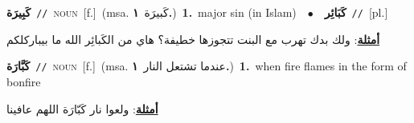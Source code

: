 \documentclass[10pt,a4paper,twoside]{article} %
\begin{document}
\begin{multicols}{2}
{\setlength\topsep{0pt}\textbf{\foreignlanguage{arabic}{كَبِيرَة}}\ {\color{gray}\texttt{//}\color{black}}\ \textsc{noun}\ [f.]\ \color{gray}(msa. \foreignlanguage{arabic}{كَبيرَة}~\foreignlanguage{arabic}{\textbf{١.}})\color{black}\ \textbf{1.}~major sin (in Islam)\ \ $\bullet$\ \ \setlength\topsep{0pt}\textbf{\foreignlanguage{arabic}{كَبَائِر}}\ {\color{gray}\texttt{//}\color{black}}\ [pl.]\  \begin{flushright}\color{gray}\foreignlanguage{arabic}{\textbf{\underline{\foreignlanguage{arabic}{أمثلة}}}: ولك بدك تهرب مع البنت تتجوزها خطيفة؟ هاي من الكَبائِر الله ما بيباركلكم}\end{flushright}\color{black}} \vspace{2mm}

{\setlength\topsep{0pt}\textbf{\foreignlanguage{arabic}{كَبَّارَة}}\ {\color{gray}\texttt{//}\color{black}}\ \textsc{noun}\ [f.]\ \color{gray}(msa. \foreignlanguage{arabic}{عندما تشتعل النار}~\foreignlanguage{arabic}{\textbf{١.}})\color{black}\ \textbf{1.}~when fire flames in the form of bonfire\  \begin{flushright}\color{gray}\foreignlanguage{arabic}{\textbf{\underline{\foreignlanguage{arabic}{أمثلة}}}: ولعوا نار كَبّارَة اللهم عافينا}\end{flushright}\color{black}} \vspace{2mm}


\end{multicols}
\end{document}
